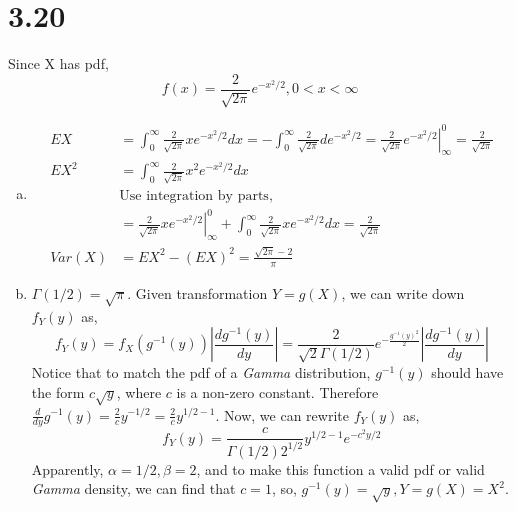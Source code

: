 \documentclass[letter]{article}
\newcommand{\sqtpi}{\sqrt{2\pi}}
\newcommand{\intzi}{\int_0^\infty}
\begin{document}
    \section*{3.20}
    Since X has pdf,
    \[
    f(x) = \frac{2}{\sqtpi} e^{-x^2/2}, 0 < x < \infty
    \]
    \begin{enumerate}[(a)]
        \item 
        \begin{align*}
        EX & = \intzi \frac{2}{\sqtpi} x e^{-x^2/2} dx = -\intzi \frac{2}{\sqtpi} d e^{-x^2/2}
        = \left. \frac{2}{\sqtpi} e^{-x^2/2} \right|^0_\infty = \frac{2}{\sqtpi} \\
        EX^2 & = \intzi \frac{2}{\sqtpi} x^2 e^{-x^2/2} dx \\
        & \text{Use integration by parts}, \\
        & = \left. \frac{2}{\sqtpi} x e^{-x^2/2} \right|_\infty^0 + \intzi \frac{2}{\sqtpi} x e^{-x^2/2} dx = \frac{2}{\sqtpi}\\
        Var(X) & = EX^2 - (EX)^2 = \frac{\sqtpi -2}{\pi}
        \end{align*}
        \item $\Gamma(1/2) = \sqrt{\pi}$. Given transformation $Y = g(X)$, we can write down $f_Y(y)$ as,
        \[
        f_Y(y)  = f_X(g^{-1}(y)) \left| \frac{d g^{-1}(y)}{dy} \right|
        = \frac{2}{\sqrt{2} \Gamma(1/2)} e^{-\frac{g^{-1}(y)^2}{2}} \left| \frac{d g^{-1}(y)}{dy} \right|
        \]
        Notice that to match the pdf of a \emph{Gamma} distribution, $g^{-1}(y)$ should have the form $c\sqrt{y}$, where $c$ is a non-zero constant. Therefore 
        $\frac{d}{dy} g^{-1}(y) = \frac{2}{c} y^{-1/2} = \frac{2}{c} y^{1/2-1}$.
        Now, we can rewrite $f_Y(y)$ as,
        \[
        f_Y(y) = \frac{c}{\Gamma(1/2) 2^{1/2}} y^{1/2-1} e^{-c^2y/2}
        \]
        Apparently, $\alpha = 1/2, \beta = 2$, and to make this function a valid pdf or valid \emph{Gamma} density, we can find that $c=1$, so, $g^{-1}(y) = \sqrt{y}, Y=g(X)=X^2$.
    \end{enumerate}
\end{document}

